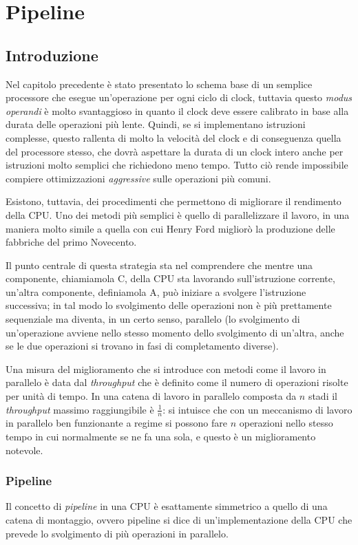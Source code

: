 \documentclass[class=book, crop=false, oneside]{standalone}
\begin{document}
\chapter{Pipeline}

\section{Introduzione}
Nel capitolo precedente è stato presentato lo schema base di un semplice processore che esegue un'operazione per ogni ciclo di clock, tuttavia questo \emph{modus operandi} è molto svantaggioso in quanto il clock deve essere calibrato in base alla durata delle operazioni più lente. Quindi, se si implementano istruzioni complesse, questo rallenta di molto la velocità del clock e di conseguenza quella del processore stesso, che dovrà aspettare la durata di un clock intero anche per istruzioni molto semplici che richiedono meno tempo. Tutto ciò rende impossibile compiere ottimizzazioni \emph{aggressive} sulle operazioni più comuni.

Esistono, tuttavia, dei procedimenti che permettono di migliorare il rendimento della CPU.
Uno dei metodi più semplici è quello di parallelizzare il lavoro, in una maniera molto simile a quella con cui Henry Ford migliorò la produzione delle fabbriche del primo Novecento.

Il punto centrale di questa strategia sta nel comprendere che mentre una componente, chiamiamola C, della CPU sta lavorando sull'istruzione corrente, un'altra componente, definiamola A, può iniziare a svolgere l'istruzione successiva; in tal modo lo svolgimento delle operazioni non è più prettamente sequenziale ma diventa, in un certo senso, parallelo (lo svolgimento di un'operazione avviene nello stesso momento dello svolgimento di un'altra, anche se le due operazioni si trovano in fasi di completamento diverse).

Una misura del miglioramento che si introduce con metodi come il lavoro in parallelo è data dal \emph{throughput} che è definito come il numero di operazioni risolte per unità di tempo. In una catena di lavoro in parallelo composta da \(n\) stadi il \emph{throughput} massimo raggiungibile è \(\frac{1}{n}\): si intuisce che con un meccanismo di lavoro in parallelo ben funzionante a regime si possono fare \(n\) operazioni nello stesso tempo in cui normalmente se ne fa una sola, e questo è un miglioramento notevole.

\subsection*{Pipeline}
Il concetto di \emph{pipeline} in una CPU è esattamente simmetrico a quello di una catena di montaggio, ovvero pipeline si dice di un'implementazione della CPU che prevede lo svolgimento di più operazioni in parallelo.
\end{document}
